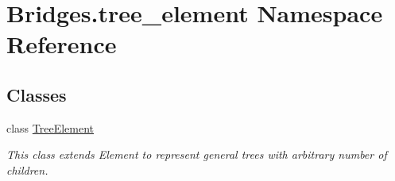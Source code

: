 \hypertarget{namespace_bridges_1_1tree__element}{}\section{Bridges.\+tree\+\_\+element Namespace Reference}
\label{namespace_bridges_1_1tree__element}
\subsection*{Classes}
\begin{DoxyCompactItemize}
\item 
class \hyperlink{class_bridges_1_1tree__element_1_1_tree_element}{Tree\+Element}
\begin{DoxyCompactList}\small\item\em This class extends Element to represent general trees with arbitrary number of children. \end{DoxyCompactList}\end{DoxyCompactItemize}
